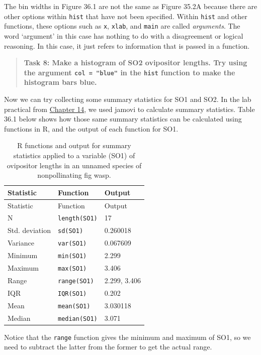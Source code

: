 \documentclass[
]{scrbook}
\begin{document}
The bin widths in Figure 36.1 are not the same as Figure 35.2A because there are other options within \texttt{hist} that have not been specified.
Within \texttt{hist} and other functions, these options such as \texttt{x}, \texttt{xlab}, and \texttt{main} are called \emph{arguments}.
The word `argument' in this case has nothing to do with a disagreement or logical reasoning.
In this case, it just refers to information that is passed in a function.

\begin{quote}
\textbf{Task 8: Make a histogram of SO2 ovipositor lengths. Try using the argument \texttt{col\ =\ "blue"} in the \texttt{hist} function to make the histogram bars blue.}
\end{quote}

Now we can try collecting some summary statistics for SO1 and SO2.
In the lab practical from \protect\hyperlink{Chapter_14}{Chapter 14}, we used jamovi to calculate summary statistics.
Table 36.1 below shows how those same summary statistics can be calculated using functions in R, and the output of each function for SO1.

\begin{longtable}[]{@{}lll@{}}
\caption{\label{tab:unnamed-chunk-211}R functions and output for summary statistics applied to a variable (SO1) of ovipositor lengths in an unnamed species of nonpollinating fig wasp.}\tabularnewline
\toprule
Statistic & Function & Output \\
\midrule
\endfirsthead
\toprule
Statistic & Function & Output \\
\midrule
\endhead
N & \texttt{length(SO1)} & 17 \\
Std. deviation & \texttt{sd(SO1)} & 0.260018 \\
Variance & \texttt{var(SO1)} & 0.067609 \\
Minimum & \texttt{min(SO1)} & 2.299 \\
Maximum & \texttt{max(SO1)} & 3.406 \\
Range & \texttt{range(SO1)} & 2.299, 3.406 \\
IQR & \texttt{IQR(SO1)} & 0.202 \\
Mean & \texttt{mean(SO1)} & 3.030118 \\
Median & \texttt{median(SO1)} & 3.071 \\
\bottomrule
\end{longtable}

Notice that the \texttt{range} function gives the minimum and maximum of SO1, so we need to subtract the latter from the former to get the actual range.
\end{document}
